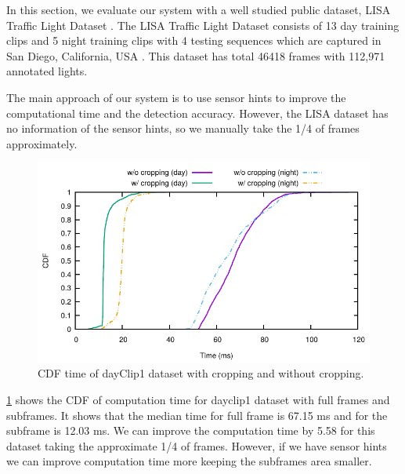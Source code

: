 In this section, we evaluate our system with a well studied public dataset, LISA Traffic Light Dataset \cite{lisa}.
The LISA Traffic Light Dataset consists of 13 day training clips and 5 night training clips with 4 testing sequences which are captured in San Diego, California, USA \cite{lisa2}.
This dataset has total 46418 frames with 112,971 annotated lights.

The main approach of our system is to use sensor hints to improve the computational time and the detection accuracy.
However, the LISA dataset has no information of the sensor hints, so we manually take the 1/4 of frames approximately.


\begin{figure}[ht!]
  \centering
  \includegraphics[width=5.2in]{plots/lisacdf.pdf}
  \caption{CDF time of dayClip1 dataset with cropping and without cropping.}
  \label{f:lisa_cdf}
\end{figure}

\ref{f:lisa_cdf} shows the CDF of computation time for dayclip1 dataset with full frames and subframes.
It shows that the median time for full frame is 67.15 ms and for the subframe is 12.03 ms.
We can improve the computation time by 5.58 for this dataset taking the approximate 1/4 of frames.
However, if we have sensor hints we can improve computation time more keeping the subframes area smaller.




